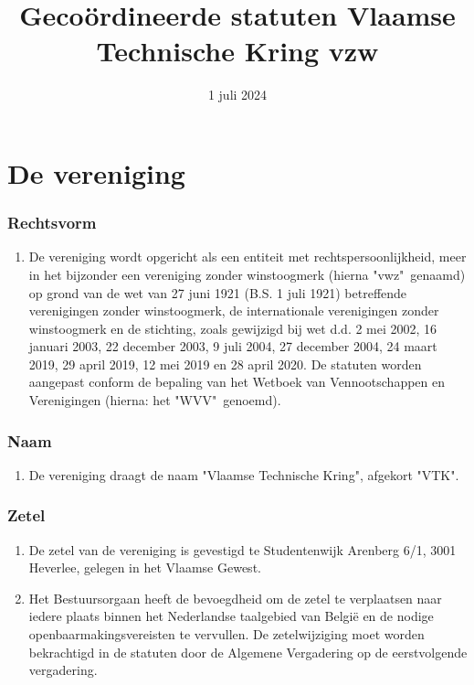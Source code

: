 




\title{Gecoördineerde statuten Vlaamse Technische Kring vzw}
\date{1 juli 2024}

\maketitle


\part{De vereniging}

    \section{Rechtsvorm}
    \begin{enumerate}
    \item De vereniging wordt opgericht als een entiteit met rechtspersoonlijkheid, meer in het bijzonder een vereniging zonder winstoogmerk (hierna "vwz"\ genaamd) op grond van de wet van 27 juni 1921 (B.S. 1 juli 1921) betreffende verenigingen zonder winstoogmerk, de internationale verenigingen zonder winstoogmerk en de stichting, zoals gewijzigd bij wet d.d. 2 mei 2002, 16 januari 2003, 22 december 2003, 9 juli 2004, 27 december 2004, 24 maart 2019, 29 april 2019, 12 mei 2019 en 28 april 2020. De statuten worden aangepast conform de bepaling van het Wetboek van Vennootschappen en Verenigingen (hierna: het "WVV"\ genoemd).
    \end{enumerate}
    
    \section{Naam}
    \begin{enumerate}
    \item De vereniging draagt de naam "Vlaamse Technische Kring", afgekort "VTK".
    \end{enumerate}
    
    \section{Zetel}
    \begin{enumerate}
    \item De zetel van de vereniging is gevestigd te Studentenwijk Arenberg 6/1, 3001 Heverlee, gelegen in het Vlaamse Gewest.
    
    \item Het Bestuursorgaan heeft de bevoegdheid om de zetel te verplaatsen naar iedere plaats binnen het Nederlandse taalgebied van België en de nodige openbaarmakingsvereisten te vervullen. De zetelwijziging moet worden bekrachtigd in de statuten door de Algemene Vergadering op de eerstvolgende vergadering.
    \end{enumerate}
    
